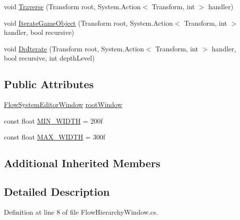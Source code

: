 \begin{DoxyCompactItemize}
void \hyperlink{class_unity_editor_1_1_u_i_1_1_windows_1_1_plugins_1_1_flow_1_1_editors_1_1_flow_hierarchy_window_ab65ee11cc571d30c2607d942a6fda67a}{Traverse} (Transform root, System.\+Action$<$ Transform, int $>$ handler)
\item 
void \hyperlink{class_unity_editor_1_1_u_i_1_1_windows_1_1_plugins_1_1_flow_1_1_editors_1_1_flow_hierarchy_window_a43500ff66b1ec56f0dfa549dd12e9b4e}{Iterate\+Game\+Object} (Transform root, System.\+Action$<$ Transform, int $>$ handler, bool recursive)
\item 
void \hyperlink{class_unity_editor_1_1_u_i_1_1_windows_1_1_plugins_1_1_flow_1_1_editors_1_1_flow_hierarchy_window_a1fdb7ec8fe1c34b70d10d4faee72501d}{Do\+Iterate} (Transform root, System.\+Action$<$ Transform, int $>$ handler, bool recursive, int depth\+Level)
\end{DoxyCompactItemize}
\subsection*{Public Attributes}
\begin{DoxyCompactItemize}
\item 
\hyperlink{class_unity_editor_1_1_u_i_1_1_windows_1_1_plugins_1_1_flow_1_1_flow_system_editor_window}{Flow\+System\+Editor\+Window} \hyperlink{class_unity_editor_1_1_u_i_1_1_windows_1_1_plugins_1_1_flow_1_1_editors_1_1_flow_hierarchy_window_ad3e04de1b29391ea1a8afd03c7a173b5}{root\+Window}
\item 
const float \hyperlink{class_unity_editor_1_1_u_i_1_1_windows_1_1_plugins_1_1_flow_1_1_editors_1_1_flow_hierarchy_window_a00459d450aa8ecb27136889eb8a0c128}{M\+I\+N\+\_\+\+W\+I\+D\+T\+H} = 200f
\item 
const float \hyperlink{class_unity_editor_1_1_u_i_1_1_windows_1_1_plugins_1_1_flow_1_1_editors_1_1_flow_hierarchy_window_a9a5daf6f4a89e1d8a73ad5dd309bbc3b}{M\+A\+X\+\_\+\+W\+I\+D\+T\+H} = 300f
\end{DoxyCompactItemize}
\subsection*{Additional Inherited Members}


\subsection{Detailed Description}


Definition at line 8 of file Flow\+Hierarchy\+Window.\+cs.



